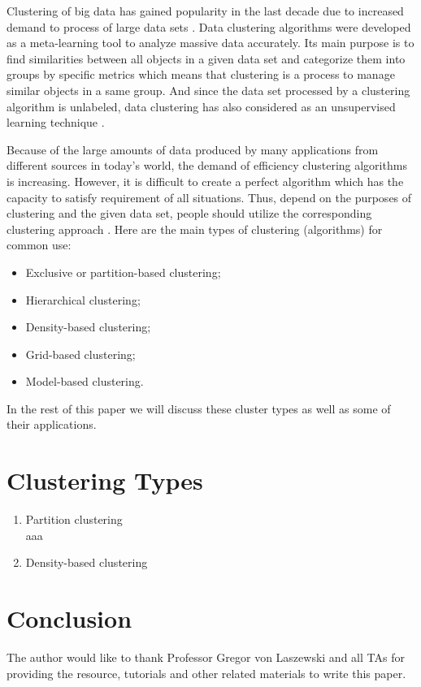 \documentclass[sigconf]{acmart}
\begin{document}
Clustering of big data has gained popularity in the last decade due to increased demand to process of large data sets \cite{bcab}. Data clustering algorithms were developed as a meta-learning tool to analyze massive data accurately. Its main purpose is to find similarities between all objects in a given data set and categorize them into groups by specific metrics which means that clustering is a process to manage similar objects in a same group. And since the data set processed by a clustering algorithm is unlabeled, data clustering has also considered as an unsupervised learning technique \cite{dcaa}.

Because of the large amounts of data produced by many applications from different sources in today's world, the demand of efficiency clustering algorithms is increasing. However, it is difficult to create a perfect algorithm which has the capacity to satisfy requirement of all situations. Thus, depend on the purposes of clustering and the given data set, people should utilize the corresponding clustering approach \cite{bcab}. Here are the main types of clustering (algorithms) for common use:
\begin{itemize}
\item Exclusive or partition-based clustering;
\item Hierarchical clustering;
\item Density-based clustering;
\item Grid-based clustering;
\item Model-based clustering.
\end{itemize}
In the rest of this paper we will discuss these cluster types as well as some of their applications.

\section{Clustering Types}
\begin{enumerate}
\item Partition clustering \\
aaa
\item Density-based clustering
\end{enumerate}
\section{Conclusion}


\begin{acks}

The author would like to thank Professor Gregor von Laszewski and all TAs for providing the resource, tutorials and other related materials to write this paper.

\end{acks}




% 
\end{document}
